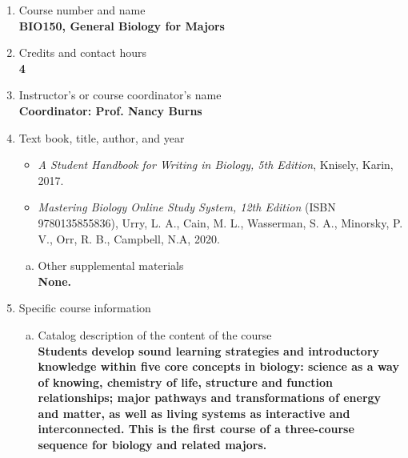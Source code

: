 \label{BIO150}  %
\begin{enumerate}[1.]
\item Course number and name\\
  {\bfseries
    BIO150, General Biology for Majors
  }
  
\item Credits and contact hours\\
  {\bfseries
    4    
  }

\item Instructor's or course coordinator's name\\
  {\bfseries
    Coordinator: Prof. Nancy Burns
  }

\item Text book, title, author, and year\\
  {\bfseries
    \begin{itemize}
    \item {\em A Student Handbook for Writing in Biology, 5th Edition}, Knisely, Karin, 2017.
    \item {\em Mastering Biology Online Study System, 12th Edition} (ISBN 9780135855836),
          Urry, L. A.,
          Cain, M. L.,
          Wasserman, S. A.,
          Minorsky, P. V.,
          Orr, R. B.,
          Campbell, N.A, 2020.
    \end{itemize}
  }
\begin{enumerate}[a.]
\item Other supplemental materials\\
  {\bfseries
    None.
  }
\end{enumerate}

\item Specific course information
\begin{enumerate}[a.]  
\item Catalog description of the content of the course\\
  {\bfseries
Students develop sound learning strategies and introductory knowledge within five core concepts in biology: science as a way of knowing, chemistry of life, structure and function relationships; major pathways and transformations of energy and matter, as well as living systems as interactive and interconnected. This is the first course of a three-course sequence for biology and related majors.
  }


\end{enumerate}
\end{enumerate}
